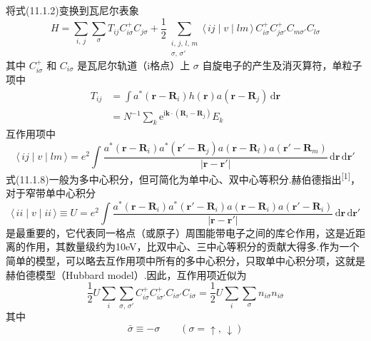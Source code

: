 将式(11.1.2)变换到瓦尼尔表象
\begin{equation}
  H=\sum_{i,\,j}\sum_{\sigma}T_{ij}C^{+}_{i\sigma}C_{j\sigma}
  +\frac{1}{2}\sum_{\substack{i,\,j,\,l,\,m\\ \sigma,\,\sigma'}}
  \langle\,ij\mid v\mid lm\,\rangle\,
  C^{+}_{i\sigma}C^{+}_{j\sigma'}C_{m\sigma'}C_{l\sigma}
\end{equation}
其中 $C^{+}_{i\sigma}$ 和 $C_{i\sigma}$ 是瓦尼尔轨道（i格点）上 $\sigma$ 自旋电子的产生及消灭算符，单粒子项中
\begin{equation}
\begin{aligned}
  T_{ij}&=\int a^{*}(\boldsymbol{r}-\boldsymbol{R}_{i})h(\boldsymbol{r})
  a(\boldsymbol{r}-\boldsymbol{R}_{j})\,\mathrm{d}\boldsymbol{r}\\
  &=N^{-1}\sum_{k}\mathrm{e}^{\mathrm{i}\boldsymbol{k}\cdot(\boldsymbol{R}_{i}-\boldsymbol{R}_{j})}E_{k}
\end{aligned}
\end{equation}
互作用项中
\begin{equation}
  \langle\,ij\mid v\mid lm\,\rangle
  =e^{2}\int\frac{a^{*}(\boldsymbol{r}-\boldsymbol{R}_{i})
  a^{*}(\boldsymbol{r}'-\boldsymbol{R}_{j})
  a(\boldsymbol{r}-\boldsymbol{R}_{l})a(\boldsymbol{r}'-\boldsymbol{R}_{m})}
  {|\boldsymbol{r}-\boldsymbol{r}'|}\,\mathrm{d}\boldsymbol{r}\,\mathrm{d}\boldsymbol{r}'
\end{equation}
式(11.1.8)一般为多中心积分，但可简化为单中心、双中心等积分.赫伯德指出\textsuperscript{[1]}，对于窄带单中心积分
\begin{equation}
  \langle\,ii\mid v\mid ii\,\rangle\equiv U
  =e^{2}\int\frac{a^{*}(\boldsymbol{r}-\boldsymbol{R}_{i})
  a^{*}(\boldsymbol{r}'-\boldsymbol{R}_{i})
  a(\boldsymbol{r}-\boldsymbol{R}_{i})a(\boldsymbol{r}'-\boldsymbol{R}_{i})}
  {|\boldsymbol{r}-\boldsymbol{r}'|}\,\mathrm{d}\boldsymbol{r}\,\mathrm{d}\boldsymbol{r}'
\end{equation}
是最重要的，它代表同一格点（或原子）周围能带电子之间的库仑作用，这是近距离的作用，其数量级约为10eV，比双中心、三中心等积分的贡献大得多.作为一个简单的模型，可以略去互作用项中所有的多中心积分，只取单中心积分项，这就是赫伯德模型（Hubbard model）.因此，互作用项近似为
\begin{equation}
  \frac{1}{2}U\sum_{i}\sum_{\sigma,\,\sigma'}
  C^{+}_{i\sigma}C^{+}_{i\sigma'}C_{i\sigma'}C_{i\sigma}
  =\frac{1}{2}U\sum_{i}\sum_{\sigma}n_{i\sigma}n_{i\bar{\sigma}}
\end{equation}
其中
\begin{equation}
  \bar{\sigma}\equiv-\sigma\qquad(\sigma=\uparrow,\,\downarrow)
\end{equation}
